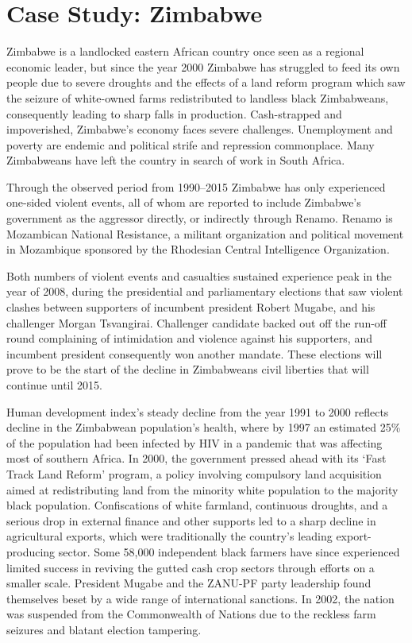 \documentclass[a4paper,11pt]{article}
\begin{document}
\section{Case Study: Zimbabwe}
Zimbabwe is a landlocked eastern African country once seen as a regional economic leader, but since the year 2000 Zimbabwe has struggled to feed its own people due to severe droughts and the effects of a land reform program which saw the seizure of white-owned farms redistributed to landless black Zimbabweans, consequently leading to sharp falls in production. Cash-strapped and impoverished, Zimbabwe's economy faces severe challenges. Unemployment and poverty are endemic and political strife and repression commonplace. Many Zimbabweans have left the country in search of work in South Africa.

Through the observed period from 1990--2015 Zimbabwe has only experienced one-sided violent events, all of whom are reported to include Zimbabwe’s government as the aggressor directly, or indirectly through Renamo. Renamo is Mozambican National Resistance, a militant organization and political movement in Mozambique sponsored by the Rhodesian Central Intelligence Organization.

Both numbers of violent events and casualties sustained experience peak in the year of 2008, during the presidential and parliamentary elections that saw violent clashes between supporters of incumbent president Robert Mugabe, and his challenger Morgan Tsvangirai. Challenger candidate backed out off the run-off round complaining of intimidation and violence against his supporters, and incumbent president consequently won another mandate. These elections will prove to be the start of the decline in Zimbabweans civil liberties that will continue until 2015.

Human development index’s steady decline from the year 1991 to 2000 reflects decline in the Zimbabwean population’s health, where by 1997 an estimated 25\% of the population had been infected by HIV in a pandemic that was affecting most of southern Africa. In 2000, the government pressed ahead with its ‘Fast Track Land Reform’ program, a policy involving compulsory land acquisition aimed at redistributing land from the minority white population to the majority black population. Confiscations of white farmland, continuous droughts, and a serious drop in external finance and other supports led to a sharp decline in agricultural exports, which were traditionally the country's leading export-producing sector. Some 58,000 independent black farmers have since experienced limited success in reviving the gutted cash crop sectors through efforts on a smaller scale. President Mugabe and the ZANU-PF party leadership found themselves beset by a wide range of international sanctions. In 2002, the nation was suspended from the Commonwealth of Nations due to the reckless farm seizures and blatant election tampering.
\end{document}
